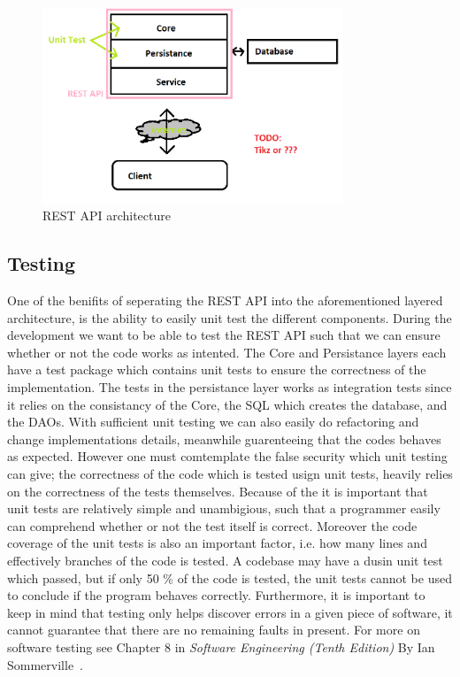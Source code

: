 \begin{figure}[h]
    \centering
    \includegraphics[width=0.8\textwidth]{figures/wip-stack.png}
    \caption{REST API architecture}
    \label{fig:rest-architecture}
\end{figure}


\subsection{Testing}
One of the benifits of seperating the REST API into the aforementioned layered architecture, is the ability to easily unit test the different components.
During the development we want to be able to test the REST API such that we can ensure whether or not the code works as intented. 
The Core and Persistance layers each have a test package which contains unit tests to ensure the correctness of the implementation. 
The tests in the persistance layer works as integration tests since it relies on the consistancy of the Core, the SQL which creates the database, and the DAOs.
With sufficient unit testing we can also easily do refactoring and change implementations details, meanwhile guarenteeing that the codes behaves as expected.
However one must comtemplate the false security which unit testing can give; the correctness of the code which is tested usign unit tests, heavily relies on the correctness of the tests themselves.
Because of the it is important that unit tests are relatively simple and unambigious, such that a programmer easily can comprehend whether or not the test itself is correct.
Moreover the code coverage of the unit tests is also an important factor, i.e. how many lines and effectively branches of the code is tested.
A codebase may have a dusin unit test which passed, but if only 50 \% of the code is tested, the unit tests cannot be used to conclude if the program behaves correctly.
Furthermore, it is important to keep in mind that testing only helps discover errors in a given piece of software, it cannot guarantee that there are no remaining faults in present. For more on software testing see Chapter 8 in \textit{Software Engineering (Tenth Edition)} By Ian Sommerville~\cite[Chapter~8]{SEBOOK}.


